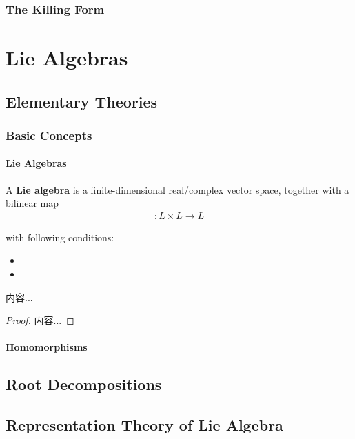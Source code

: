 \documentclass[Total.tex]{subfiles}
\begin{document}
			\subsection{The Killing Form}
	\chapter{Lie Algebras}
		\section{Elementary Theories}
			\subsection{Basic Concepts}
				\subsubsection{Lie Algebras}
				
					\begin{Def}
						A \textbf{Lie algebra} is a finite-dimensional real/complex vector space, together with a bilinear map
						\begin{gather*}
							[-|-]:L\times L\rightarrow L
						\end{gather*}
						
						with following conditions:
						\begin{itemize}
							\item 
							\item 
						\end{itemize}
					\end{Def}
					
					\begin{proposition}
						内容...
					\end{proposition}
					\begin{proof}
						内容...
					\end{proof}
					
					\subsubsection{Homomorphisms}
		\section{Root Decompositions}
		\section{Representation Theory of Lie Algebra}
\end{document}
